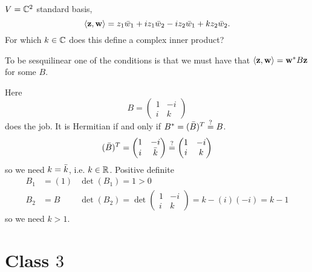 \documentclass[10pt, a4paper]{article}
\begin{document}
\begin{problem}
    $V = \mathbb{C} ^ 2$ standard basis,
    \[
    \langle\mathbf{z}, \mathbf{w}\rangle = z_1\Bar{w}_1 + iz_1\Bar{w}_2 - iz_2\Bar{w}_1 + kz_2\Bar{w}_2.
    \]
    For which $k \in \mathbb{C}$ does this define a complex inner product?

    \begin{solution}
        To be sesquilinear one of the conditions is that we must have that $\langle\mathbf{z}, \mathbf{w}\rangle = \mathbf{w} ^ {*}B\mathbf{z}$ for some $B$.

        Here
        \[
        B = \begin{pmatrix}
            1 & -i \\
            i & k
        \end{pmatrix}
        \]
        does the job.
        It is Hermitian if and only if $B ^ {*} = (\Bar{B}) ^ T \overset{?}{=} B$.
        \[
        (\Bar{B}) ^ T = \begin{pmatrix}
            1 & -i \\ i & \bar{k}
        \end{pmatrix} \overset{?}{=} \begin{pmatrix}
            1 & -i \\ i & k
        \end{pmatrix}
        \]
        so we need $k = \Bar{k}$,
        i.e. $k \in \mathbb{R}$.
        Positive definite
        \begin{align*}
            B_1 &= (1)&\det(B_1) = 1 > 0 \\
            B_2 &= B&\det(B_2) = \det\begin{pmatrix}
                1 & -i \\ i & k
            \end{pmatrix} = k - (i)(-i) = k - 1
        \end{align*}
        so we need $k > 1$.
        \[
        \]
        
    \end{solution}
\end{problem}

\newpage

\section{Class \texorpdfstring{$3$}{}}
\end{document}
